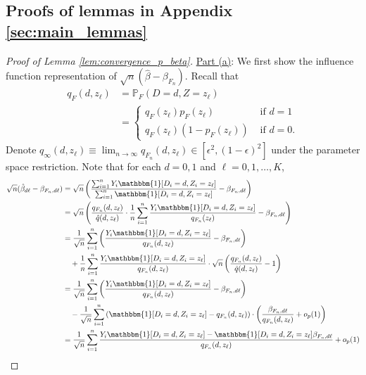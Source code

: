 \documentclass[11pt]{article}
\theoremstyle{definition}
\newcommand{\Prob}{\ensuremath{\mathbb{P}}} %
\newcommand{\0}{\ensuremath{\mathbf{0}}}
\newcommand{\indicator}{\ensuremath{\mathbbm{1}}}
\begin{document}
\begin{bibunit}
%
\section{Proofs of lemmas in Appendix \ref{sec:main_lemmas}}
\label{appendix:lemma_proofs}

%
\begin{proof}[Proof of Lemma \ref{lem:convergence_p_beta}]
    \underline{Part (a)}:
	We first show the influence function representation of $\sqrt{n}(\hat{\beta} - \beta_{F_n})$. Recall that
	\begin{align*}
		q_{F}(d,z_\ell) 
		& = \Prob_F(D=d, Z=z_\ell) \\
		& = \begin{cases}
			q_{F}(z_\ell)p_F(z_\ell) & \text{ if } d = 1\\
			q_F(z_\ell)(1-p_F(z_\ell)) & \text{ if } d = 0.
		\end{cases} 
	\end{align*} 
	Denote $q_\infty(d,z_\ell) \equiv \lim_{n\to\infty} q_{F_n}(d,z_\ell) \in [\epsilon^2, (1-\epsilon)^2]$ under the parameter space restriction.
	Note that for each $d = 0,1$ and $\ell = 0,1,\ldots,K$,
	{\allowdisplaybreaks
	\begin{align*}
		\sqrt{n}(\hat{\beta}_{d\ell} - \beta_{F_n,d\ell})
		&= \sqrt{n}\left(\frac{\sum_{i=1}^n Y_i\indicator[D_i = d, Z_i = z_\ell]}{\sum_{i=1}^n \indicator[D_i = d, Z_i = z_\ell]} - \beta_{F_n,d\ell} \right) \\
		&= \sqrt{n}\left(\frac{q_{F_n}(d,z_\ell)}{\hat{q}(d,z_\ell)}\cdot \frac{1}{n}\sum_{i=1}^n \frac{Y_i \indicator[D_i = d, Z_i = z_\ell]}{q_{F_n}(z_\ell)} - \beta_{F_n,d\ell} \right) \\
		&= \frac{1}{\sqrt{n}}\sum_{i=1}^n \left(\frac{Y_i\indicator[D_i=d, Z_i = z_\ell]}{q_{F_n}(d, z_\ell)} - \beta_{F_n,d\ell} \right) \\
		&\quad + \frac{1}{n}\sum_{i=1}^n \frac{Y_i\indicator[D_i=d, Z_i=z_\ell]}{q_{F_n}(d,z_\ell)}\cdot \sqrt{n}\left(\frac{q_{F_n}(d,z_\ell)}{\hat{q}(d,z_\ell)} - 1\right) \\
		&= \frac{1}{\sqrt{n}}\sum_{i=1}^n \left(\frac{Y_i\indicator[D_i=d, Z_i = z_\ell]}{q_{F_n}(d, z_\ell)} - \beta_{F_n,d\ell} \right) \\
		&\quad - \frac{1}{\sqrt{n}}\sum_{i=1}^n \left(\indicator[D_i = d, Z_i = z_\ell] - q_{F_n}(d,z_\ell)\right) \cdot \left(\frac{\beta_{F_n,d\ell}}{q_{F_n}(d, z_\ell)} + o_p(1)\right) \\
		&= \frac{1}{\sqrt{n}} \sum_{i=1}^n \frac{Y_i\indicator[D_i = d, Z_i = z_\ell] - \indicator[D_i=d, Z_i = z_\ell]\beta_{F_n, d\ell}}{q_{F_n}(d,z_\ell)} + o_p(1) \\

\end{align*}}
\end{proof}
\end{bibunit}
\end{document}

